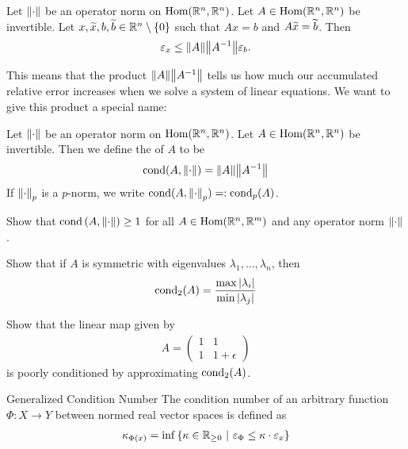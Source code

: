\begin{theorem}
	Let $\norm{\cdot}$ be an operator norm on $\textnormal{Hom}(\mathbb{R}^n, \mathbb{R}^n)$. Let $A \in \textnormal{Hom}(\mathbb{R}^n, \mathbb{R}^n)$ be invertible. Let $x,\widetilde x,b,\widetilde b \in \mathbb{R}^n \setminus \qty{0}$ such that $Ax = b$ and $A\widetilde x = \widetilde b$. Then
	\begin{align*}
		\varepsilon_x \leq \norm{A}\norm{A^{-1}}\varepsilon_b.
	\end{align*}
\end{theorem}
This means that the product $\norm{A}\norm{A^{-1}}$ tells us how much our accumulated relative error increases when we solve a system of linear equations. We want to give this product a special name:
\begin{importantdefinition}{}{}
	Let $\norm{\cdot}$ be an operator norm on $\textnormal{Hom}(\mathbb{R}^n, \mathbb{R}^n)$. Let $A \in \textnormal{Hom}(\mathbb{R}^n, \mathbb{R}^n)$ be invertible. Then we define the  of $A$ to be
	\begin{align*}
		\operatorname{cond}(A, \norm{\cdot}) = \norm{A}\norm{A^{-1}}
	\end{align*}
	If $\norm{\cdot}_p$ is a $p$-norm, we write $\operatorname{cond}(A, \norm{\cdot}_p) =: \operatorname{cond}_p(A)$.
\end{importantdefinition}
\begin{exercise}
	Show that $\operatorname{cond}\qty(A, \norm{\cdot}) \geq 1$ for all $A \in \textnormal{Hom}(\mathbb{R}^n, \mathbb{R}^m)$ and any operator norm $\norm{\cdot}$.
\end{exercise}
\begin{exercise}
	Show that if $A$ is symmetric with eigenvalues $\lambda_1, \hdots, \lambda_n$, then
	\begin{align*}
		\operatorname{cond}_2(A) = \frac{\max \abs{\lambda_i}}{\min \abs{\lambda_j}}
	\end{align*}
\end{exercise}
\begin{exercise}
	Show that the linear map given by
	\begin{align*}
		A = 
		\begin{pmatrix}
			1 & 1\\
			1 & 1+\epsilon
		\end{pmatrix}
	\end{align*}
	is poorly conditioned by approximating $\operatorname{cond}_2(A)$.
\end{exercise}
\begin{importantdefinition}{Generalized Condition Number}{}
	The condition number of an arbitrary function $\Phi : X \to Y$ between normed real vector spaces is defined as
	\begin{align*}
		\kappa_{\Phi(x)} = \inf \lr{\kappa \in \bR_{\geq 0} \mid \epsilon_\Phi \leq \kappa \cdot \epsilon_x}
	\end{align*}
\end{importantdefinition}
